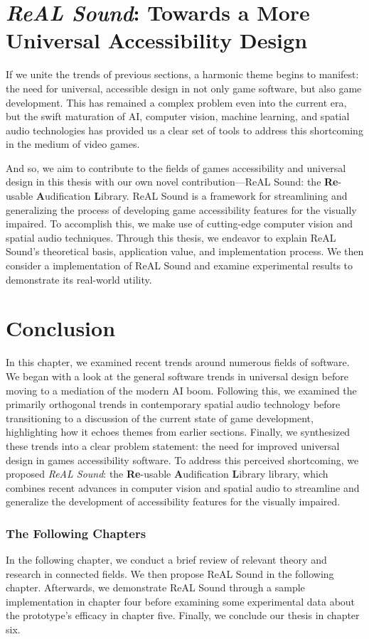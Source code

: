 \documentclass{report}
\newcommand{\rs}{ReAL Sound\xspace}
\newcommand{\rsfull}{\textbf{Re}-usable \textbf{A}udification \textbf{L}ibrary\xspace}
\begin{document}
\section{\emph{\rs}: Towards a More Universal Accessibility Design}
If we unite the trends of previous sections, a harmonic theme begins to manifest: the need for universal, accessible design in not only game software, but also game development. This has remained a complex problem even into the current era, but the swift maturation of AI, computer vision, machine learning, and spatial audio technologies has provided us a clear set of tools to address this shortcoming in the medium of video games. 

And so, we aim to contribute to the fields of games accessibility and universal design in this thesis with our own novel contribution---\rs: the \rsfull. \rs is a framework for streamlining and generalizing the process of developing game accessibility features for the visually impaired. To accomplish this, we make use of cutting-edge computer vision and spatial audio techniques. Through this thesis, we endeavor to explain \rs's theoretical basis, application value, and implementation process. We then consider a implementation of \rs and examine experimental results to demonstrate its real-world utility.


\section{Conclusion}
In this chapter, we examined recent trends around numerous fields of software. We began with a look at the general software trends in universal design before moving to a mediation of the modern AI boom. Following this, we examined the primarily orthogonal trends in contemporary spatial audio technology before transitioning to a discussion of the current state of game development, highlighting how it echoes themes from earlier sections. Finally, we synthesized these trends into a clear problem statement: the need for improved universal design in games accessibility software. To address this perceived shortcoming, we proposed \emph{\rs}: the \rsfull library, which combines recent advances in computer vision and spatial audio to streamline and generalize the development of accessibility features for the visually impaired. 

\subsubsection{The Following Chapters}
In the following chapter, we conduct a brief review of relevant theory and research in connected fields. We then propose \rs in the following chapter. Afterwards, we demonstrate \rs through a sample implementation in chapter four before examining some experimental data about the prototype's efficacy in chapter five. Finally, we conclude our thesis in chapter six.
\end{document}
